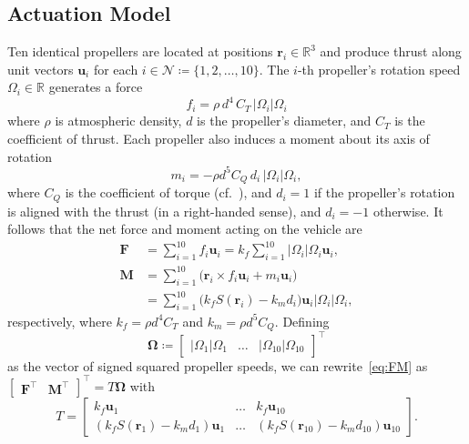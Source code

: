 \documentclass[journal]{IEEEtran}
\newcommand{\norm}[1]{\left| #1 \right|}
\newcommand{\tp}{^\top}
\begin{document}
\subsection{Actuation Model}
Ten identical propellers are located at positions $\bm{r}_i\in\mathbb{R}^3$ and produce thrust along unit vectors $\bm{u}_i$ for each $i\in\mathcal{N}\coloneqq\{1,2,\ldots,10\}$. The $i$-th propeller's rotation speed $\Omega_i\in\mathbb{R}$ generates a force
$$f_i = \rho\, d^4\, C_T\,\norm{\Omega_i}\Omega_i$$ 
where $\rho$ is atmospheric density, $d$ is the propeller's diameter, and $C_T$ is the coefficient of thrust. 
Each propeller also induces a moment about its axis of rotation
$$m_i = -\rho d^5 C_Q\, d_i\,\norm{\Omega_i}\Omega_i,$$
where $C_Q$ is the coefficient of torque (cf.~\cite{VonMises1959}), and $d_i=1$ if the propeller's rotation is aligned with the thrust (in a right-handed sense), and $d_i=-1$ otherwise. It follows that the net force and moment acting on the vehicle are
\begin{equation}\label{eq:FM}
\begin{aligned}
\bm{F} &= \sum_{i=1}^{10} f_i\bm{u}_i = k_f\sum_{i=1}^{10}\norm{\Omega_i}\Omega_i\bm{u}_i,\\
\bm{M} &= \sum_{i=1}^{10}\bigl(\bm{r}_i\times f_i\bm{u}_i + m_i\bm{u}_i\bigr) \\
&= \sum_{i=1}^{10}\bigl(k_fS(\bm{r}_i) - k_m d_i\bigr)\bm{u}_i\norm{\Omega_i}\Omega_i,
\end{aligned}
\end{equation}
respectively, where $k_f = \rho d^4 C_T$ and $k_m = \rho d^5 C_Q$. Defining 
\begin{equation}\label{eq:Omega}
\bm{\Omega}\coloneqq \begin{bmatrix}
\norm{\Omega_1}\Omega_1 & \ldots & \norm{\Omega_{10}}\Omega_{10}\end{bmatrix}\tp
\end{equation}
as the vector of signed squared propeller speeds, we can rewrite~\eqref{eq:FM} as $\begin{bmatrix} \bm{F}\tp & \bm{M}\tp \end{bmatrix}\tp = T\bm{\Omega}$ with 
\begin{equation}\label{eq:T}
T = \begin{bmatrix}
 k_f\bm{u}_1 &\ldots& k_f\bm{u}_{10}\\
 \left(k_fS(\bm{r}_1) - k_m d_1\right)\bm{u}_1 &\ldots& \left(k_fS(\bm{r}_{10}) - k_m d_{10}\right)\bm{u}_{10}
 \end{bmatrix}.
\end{equation}
\end{document}
